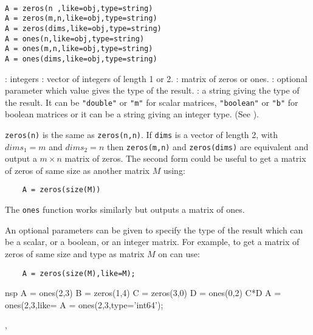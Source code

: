 \begin{mandesc}
  \\ 
\end{mandesc}
\begin{calling_sequence}
\begin{verbatim}
A = zeros(n ,like=obj,type=string)
A = zeros(m,n,like=obj,type=string)
A = zeros(dims,like=obj,type=string)
A = ones(n,like=obj,type=string)
A = ones(m,n,like=obj,type=string)
A = ones(dims,like=obj,type=string)
\end{verbatim}
\end{calling_sequence}
\begin{parameters}
  \begin{varlist}
    : integers
    : vector of integers of length 1 or 2.
    : matrix of zeros or ones.
    : optional parameter which value gives the type of the result.
    : a string giving the type of the result. It can be \verb+"double"+ or \verb+"m"+ for 
    scalar matrices, \verb+"boolean"+ or \verb+"b"+ for boolean matrices or it can be a string giving 
    an integer type. (See ).
  \end{varlist}
\end{parameters}

\begin{mandescription}
\verb+zeros(n)+ is the same as \verb+zeros(n,n)+. If \verb+dims+ is a vector of length 2, 
with $dims_1 = m$ and $dims_2 = n$ then \verb+zeros(m,n)+ and  \verb+zeros(dims)+ are equivalent 
and output a $m \times n$ matrix of zeros. The second form could be useful to get a matrix of 
zeros of same size as another matrix $M$ using:
\begin{verbatim}
    A = zeros(size(M))
\end{verbatim}

The \verb+ones+ function works similarly but outputs a matrix of ones.

An optional parameters can be given to specify the type of the result which can 
be a scalar, or a boolean, or an integer matrix. For example, to get a matrix of 
zeros of same size and type as matrix $M$ on can use:
\begin{verbatim}
    A = zeros(size(M),like=M);
\end{verbatim}

\end{mandescription}

\begin{examples}
\begin{mintednsp}{nsp}
A = ones(2,3) 
B = zeros(1,4)
C = zeros(3,0)
D = ones(0,2)
C*D
A = ones(2,3,like=%
A = ones(2,3,type='int64');
\end{mintednsp} 

\end{examples}

\begin{manseealso}
, 
\end{manseealso}

